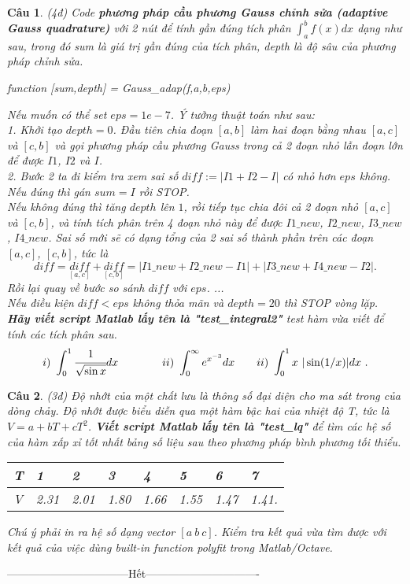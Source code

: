 \documentclass[11pt]{article}
\newtheorem{bt}{Câu}
\begin{document}
\begin{bt}(4đ) Code \textbf{phương pháp cầu phương Gauss chỉnh sửa (adaptive Gauss quadrature)} với 2 nút để tính gần đúng tích phân $\int_{a}^{b} f(x)dx$ 
dạng như sau, trong đó sum là giá trị gần đúng của tích phân, depth là độ sâu của phương pháp chỉnh sửa.
%
\begin{center}
	\emph{function [sum,depth] = Gauss\_adap(f,a,b,eps)} 
\end{center}	
%
Nếu muốn có thể set $eps = 1e-7$. Ý tưởng thuật toán như sau: \\
1. Khởi tạo $depth=0$. Đầu tiên chia đoạn $[a,b]$ làm hai đoạn bằng nhau $[a,c]$ và $[c,b]$ và gọi phương pháp cầu phương Gauss trong cả 2 đoạn nhỏ lẫn đoạn lớn để được $I1$, $I2$ và $I$. \\
2. Bước 2 ta đi kiểm tra xem sai số $diff := |I1+I2-I|$ có nhỏ hơn $eps$ không.\\ 
Nếu đúng thì gán $sum=I$ rồi STOP. \\
Nếu không đúng thì tăng $depth$ lên $1$, rồi tiếp tục chia đôi cả 2 đoạn nhỏ $[a,c]$ và $[c,b]$, và tính tích phân trên 4 đoạn nhỏ này để được $I1\_new$, $I2\_new$, $I3\_new$, $I4\_new$. Sai số mới sẽ có dạng tổng của 2 sai số thành phần trên các đoạn $[a,c]$, $[c,b]$, tức là
%
\[ diff = \underset{[a,c]}{diff} + \underset{[c,b]}{diff} = |I1\_new  +  I2\_new - I1| +  |I3\_new  +  I4\_new - I2| .\]
%
Rồi lại quay về bước so sánh $diff$ với $eps$. ...\\
Nếu điều kiện $diff<eps$ không thỏa mãn và $depth = 20$ thì STOP vòng lặp. \\ 
\textbf{Hãy viết script Matlab lấy tên là "test\_integral2"} test hàm vừa viết để tính các tích phân sau.
\[ i)\ \int_{0}^{1} \cfrac{1}{\sqrt{\sin x}} dx \qquad \qquad ii) \ \int_{0}^{\infty} e^{x^{-3}}dx  \qquad ii) \ \int_{0}^{1} x \ |\sin (1/x)|dx  \ .  \]
\end{bt}

\begin{bt}(3đ) %
Độ nhớt của một chất lưu là thông số đại diện cho ma sát trong của dòng chảy. Độ nhớt được biểu diễn qua một hàm bậc hai của nhiệt độ T, tức là $V = a + bT + cT^2$. \textbf{Viết script Matlab lấy tên là "test\_lq"} để tìm các hệ số của hàm xấp xỉ tốt nhất bảng số liệu sau theo phương pháp bình phương tối thiểu.
	\begin{center}
		\begin{tabular}[7]{l|l|l|l|l|l|l|l}
			T & 1    & 2    & 3    & 4    & 5    & 6    & 7 \\ \hline
			V & 2.31 & 2.01 & 1.80 & 1.66 & 1.55 & 1.47 & 1.41.
		\end{tabular}	
	\end{center}
Chú ý phải in ra hệ số dạng vector $[a \ b \ c]$. Kiểm tra kết quả vừa tìm được với kết quả của việc dùng built-in function polyfit trong Matlab/Octave. 
\end{bt}

\centerline{———————————Hết——————————-}
\end{document}
